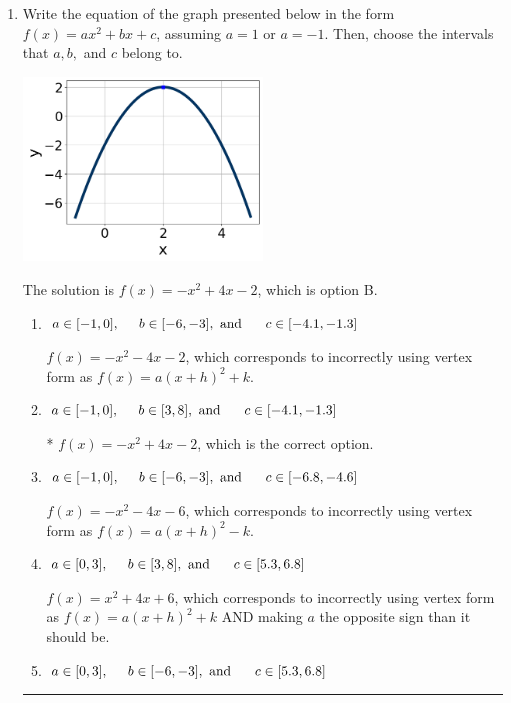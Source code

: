 \documentclass{extbook}[14pt]
\newcommand{\litem}[1]{\item #1

\rule{\textwidth}{0.4pt}}
\begin{document}
\begin{enumerate}\litem{
Write the equation of the graph presented below in the form $f(x)=ax^2+bx+c$, assuming  $a=1$ or $a=-1$. Then, choose the intervals that $a, b,$ and $c$ belong to.

\begin{center}
    \includegraphics[width=0.5\textwidth]{../Figures/quadraticGraphToEquationC.png}
\end{center}


The solution is \( f(x) = -x^{2} +4 x -2 \), which is option B.\begin{enumerate}[label=\Alph*.]
\item \( a \in [-1, 0], \hspace*{5mm} b \in [-6, -3], \text{ and } \hspace*{5mm} c \in [-4.1, -1.3] \)

$f(x)=-x^{2} -4 x -2$, which corresponds to incorrectly using vertex form as $f(x) = a(x+h)^2+k$.
\item \( a \in [-1, 0], \hspace*{5mm} b \in [3, 8], \text{ and } \hspace*{5mm} c \in [-4.1, -1.3] \)

* $f(x)=-x^{2} +4 x -2$, which is the correct option.
\item \( a \in [-1, 0], \hspace*{5mm} b \in [-6, -3], \text{ and } \hspace*{5mm} c \in [-6.8, -4.6] \)

$f(x)=-x^{2} -4 x -6$, which corresponds to incorrectly using vertex form as $f(x) = a(x+h)^2 - k$.
\item \( a \in [0, 3], \hspace*{5mm} b \in [3, 8], \text{ and } \hspace*{5mm} c \in [5.3, 6.8] \)

$f(x)=x^{2} +4 x + 6$, which corresponds to incorrectly using vertex form as $f(x) = a(x+h)^2+k$ AND making $a$ the opposite sign than it should be.
\item \( a \in [0, 3], \hspace*{5mm} b \in [-6, -3], \text{ and } \hspace*{5mm} c \in [5.3, 6.8] \)


\end{enumerate}}
\end{enumerate}
\end{document}
